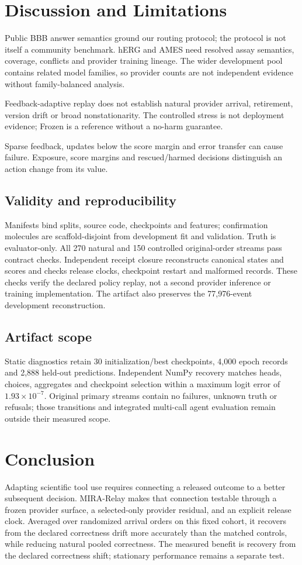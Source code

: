 \documentclass[sigconf,anonymous]{aamas}
\begin{document}
\section{Discussion and Limitations}
Public BBB answer semantics ground our routing protocol; the protocol is not itself a community benchmark. hERG and AMES need resolved assay semantics, coverage, conflicts and provider training lineage. The wider development pool contains related model families, so provider counts are not independent evidence without family-balanced analysis.

Feedback-adaptive replay does not establish natural provider arrival, retirement, version drift or broad nonstationarity. The controlled stress is not deployment evidence; Frozen is a reference without a no-harm guarantee.

Sparse feedback, updates below the score margin and error transfer can cause failure. Exposure, score margins and rescued/harmed decisions distinguish an action change from its value.

\subsection{Validity and reproducibility}
Manifests bind splits, source code, checkpoints and features; confirmation molecules are scaffold-disjoint from development fit and validation. Truth is evaluator-only. All 270 natural and 150 controlled original-order streams pass contract checks. Independent receipt closure reconstructs canonical states and scores and checks release clocks, checkpoint restart and malformed records. These checks verify the declared policy replay, not a second provider inference or training implementation. The artifact also preserves the 77,976-event development reconstruction.

\subsection{Artifact scope}
Static diagnostics retain 30 initialization/best checkpoints, 4,000 epoch records and 2,888 held-out predictions. Independent NumPy recovery matches heads, choices, aggregates and checkpoint selection within a maximum logit error of $1.93\times10^{-7}$. Original primary streams contain no failures, unknown truth or refusals; those transitions and integrated multi-call agent evaluation remain outside their measured scope.

\section{Conclusion}
Adapting scientific tool use requires connecting a released outcome to a better subsequent decision. MIRA-Relay makes that connection testable through a frozen provider surface, a selected-only provider residual, and an explicit release clock. Averaged over randomized arrival orders on this fixed cohort, it recovers from the declared correctness drift more accurately than the matched controls, while reducing natural pooled correctness. The measured benefit is recovery from the declared correctness shift; stationary performance remains a separate test.

\clearpage
\balance


\end{document}
